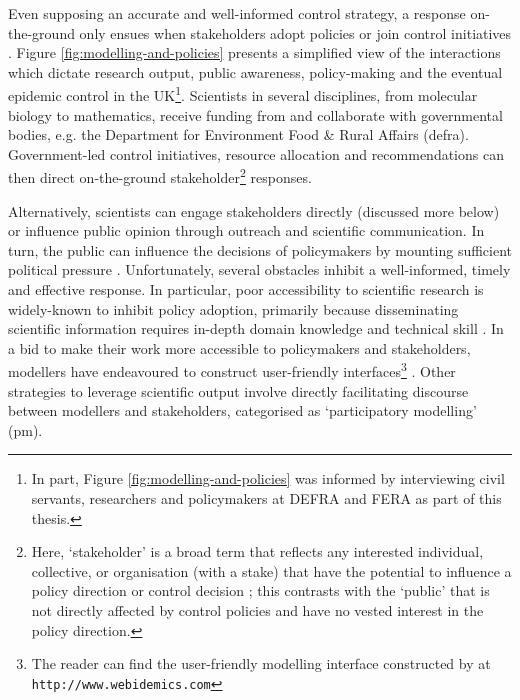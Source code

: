 Even supposing an accurate and well-informed control strategy,
a response on-the-ground only ensues when stakeholders adopt policies or join control initiatives \cite{reed2018theory}.
Figure \ref{fig:modelling-and-policies} presents a simplified view of the interactions which dictate research output, public awareness, 
policy-making and the eventual epidemic control in the UK\footnote{
In part, Figure \ref{fig:modelling-and-policies} was informed by interviewing civil servants, researchers and policymakers at DEFRA and FERA as part of this thesis.}. Scientists in several disciplines,
from molecular biology to mathematics, receive funding from and collaborate with governmental
bodies, e.g. the Department for Environment Food \& Rural Affairs (\acrshort{defra}). Government-led control initiatives, resource
allocation and recommendations can then direct on-the-ground stakeholder\footnote{Here, `stakeholder' is a broad
term that reflects any interested individual, collective, or organisation 
(with a stake) that have the potential to influence a policy direction or control decision
\cite{brugha2000stakeholder}; this contrasts with the `public' that is not directly affected by control policies and have no vested interest in the policy direction.} 
responses. 

Alternatively, scientists can engage stakeholders directly (discussed more below) or influence public opinion through outreach and
scientific communication. In turn, the public can influence the decisions of policymakers by
mounting sufficient political pressure \cite{fuller2016public}.
Unfortunately, several obstacles inhibit a well-informed, timely and effective response. 
In particular, poor accessibility to scientific research is widely-known to inhibit policy adoption, 
primarily because disseminating scientific information requires in-depth domain knowledge and technical skill \cite{jones2020modelling}.
In a bid to make their work more accessible to policymakers and stakeholders, modellers have endeavoured to construct user-friendly interfaces\footnote{
The reader can find the user-friendly modelling interface constructed by \cite{WEBIDEMICS} at \nolinkurl{http://www.webidemics.com}} \cite{WEBIDEMICS}.
Other strategies to leverage scientific output involve directly facilitating discourse between modellers and stakeholders, categorised as `participatory modelling' (\acrshort{pm}).

